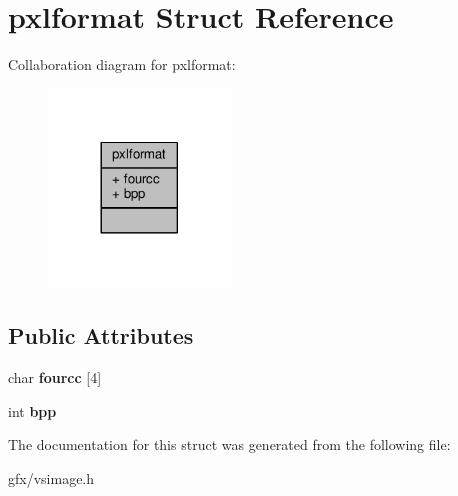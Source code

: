 \hypertarget{structpxlformat}{}\section{pxlformat Struct Reference}
\label{structpxlformat}


Collaboration diagram for pxlformat\+:
\nopagebreak
\begin{figure}[H]
\begin{center}
\leavevmode
\includegraphics[width=137pt]{d4/dd0/structpxlformat__coll__graph}
\end{center}
\end{figure}
\subsection*{Public Attributes}
\begin{DoxyCompactItemize}
\item 
char {\bfseries fourcc} \mbox{[}4\mbox{]}\hypertarget{structpxlformat_a192cedee3482a89139850a4cc266c554}{}\label{structpxlformat_a192cedee3482a89139850a4cc266c554}

\item 
int {\bfseries bpp}\hypertarget{structpxlformat_a3c93b90c8f257a21d6bc0e7b84ccaef6}{}\label{structpxlformat_a3c93b90c8f257a21d6bc0e7b84ccaef6}

\end{DoxyCompactItemize}


The documentation for this struct was generated from the following file\+:\begin{DoxyCompactItemize}
\item 
gfx/vsimage.\+h\end{DoxyCompactItemize}
